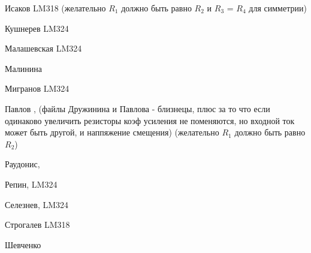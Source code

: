 \documentclass[a4paper,11pt]{article}
\begin{document}
Исаков  LM318 (желательно $R_1$ должно быть равно $R_2$ и $R_3$ = $R_4$  для симметрии)

Кушнерев LM324

Малашевская LM324

Малинина

Мигранов LM324


Павлов , (файлы Дружинина и Павлова - близнецы, плюс за то что если одинаково увеличить резисторы коэф усиления не поменяются, но входной ток может быть другой, и наппяжение смещения)
(желательно $R_1$ должно быть равно $R_2$)

Раудонис, 

Репин, LM324

Селезнев, LM324

Строгалев LM318

Шевченко
\end{document}
